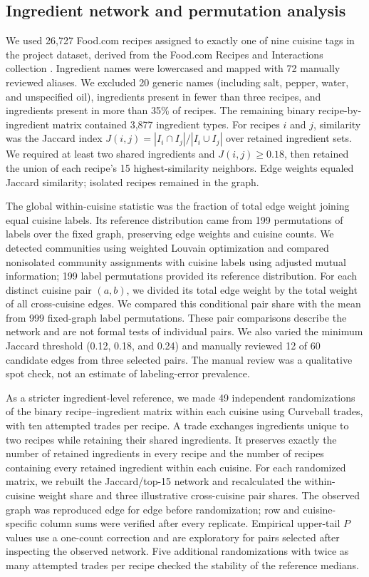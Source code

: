 \subsection*{Ingredient network and permutation analysis}
We used 26,727 Food.com recipes assigned to exactly one of nine cuisine tags in the project dataset, derived from the Food.com Recipes and Interactions collection \cite{Majumder2019}. Ingredient names were lowercased and mapped with 72 manually reviewed aliases. We excluded 20 generic names (including salt, pepper, water, and unspecified oil), ingredients present in fewer than three recipes, and ingredients present in more than 35\% of recipes. The remaining binary recipe-by-ingredient matrix contained 3,877 ingredient types. For recipes $i$ and $j$, similarity was the Jaccard index $J(i,j)=|I_i\cap I_j|/|I_i\cup I_j|$ over retained ingredient sets. We required at least two shared ingredients and $J(i,j)\geq0.18$, then retained the union of each recipe's 15 highest-similarity neighbors. Edge weights equaled Jaccard similarity; isolated recipes remained in the graph.

The global within-cuisine statistic was the fraction of total edge weight joining equal cuisine labels. Its reference distribution came from 199 permutations of labels over the fixed graph, preserving edge weights and cuisine counts. We detected communities using weighted Louvain optimization and compared nonisolated community assignments with cuisine labels using adjusted mutual information; 199 label permutations provided its reference distribution. For each distinct cuisine pair $(a,b)$, we divided its total edge weight by the total weight of all cross-cuisine edges. We compared this conditional pair share with the mean from 999 fixed-graph label permutations. These pair comparisons describe the network and are not formal tests of individual pairs. We also varied the minimum Jaccard threshold (0.12, 0.18, and 0.24) and manually reviewed 12 of 60 candidate edges from three selected pairs. The manual review was a qualitative spot check, not an estimate of labeling-error prevalence.

As a stricter ingredient-level reference, we made 49 independent randomizations of the binary recipe--ingredient matrix within each cuisine using Curveball trades, with ten attempted trades per recipe. A trade exchanges ingredients unique to two recipes while retaining their shared ingredients. It preserves exactly the number of retained ingredients in every recipe and the number of recipes containing every retained ingredient within each cuisine. For each randomized matrix, we rebuilt the Jaccard/top-15 network and recalculated the within-cuisine weight share and three illustrative cross-cuisine pair shares. The observed graph was reproduced edge for edge before randomization; row and cuisine-specific column sums were verified after every replicate. Empirical upper-tail $P$ values use a one-count correction and are exploratory for pairs selected after inspecting the observed network. Five additional randomizations with twice as many attempted trades per recipe checked the stability of the reference medians.

